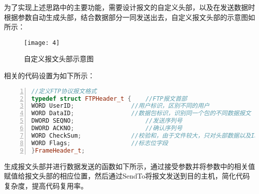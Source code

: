 \documentclass[lang=cn,11pt]{elegantpaper}
\begin{document}
为了实现上述思路中的主要功能，需要设计报文的自定义头部，以及在发送数据时根据参数自动生成头部，结合数据部分一同发送出去，自定义报文头部的示意图如 所示：

\begin{figure}[H]
	\centering
	\texttt{[image: 4]}
	\caption{自定义报文头部示意图 \label{fig:4}}
\end{figure}

相关的代码设置为如下所示：

\begin{lstlisting}[language = C++, numbers=left, 
numberstyle=\tiny,keywordstyle=\color{blue!70},
commentstyle=\color{red!50!green!50!blue!50},frame=shadowbox,
rulesepcolor=\color{red!20!green!20!blue!20},basicstyle=\ttfamily]
//定义FTP协议报文格式
typedef struct FTPHeader_t {	//FTP报文首部
WORD UserID;				//用户标识，区别不同的用户
WORD DataID;				//数据包标识，识别同一个包的不同数据报文
DWORD SEQNO;					//发送序列号
DWORD ACKNO;					//确认序列号
WORD CheckSum;				//校验和，由于文件较大，只对头部数据以及IP地址和端口数据做校验
WORD Flags;					//标志位字段
}FrameHeader_t;

\end{lstlisting}

生成报文头部并进行数据发送的函数如下所示，通过接受参数并将参数中的相关值赋值给报文头部的相应位置，然后通过SendTo将报文发送到目的主机，简化代码复杂度，提高代码复用率。
\end{document}
